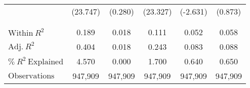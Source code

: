 \begin{xltabular}{\linewidth}{X * {5}{S[table-format=4.3]}}
 & (23.747) & (0.280) & (23.327) & (-2.631) & (0.873)\\
 &  &  &  &  \vphantom{1} & \\
\midrule
 &  &  &  &  & \\
$\textrm{Within} \: R^2$ & {0.189} & {0.018} & {0.111} & {0.052} & {0.058}\\
$\textrm{Adj.} \: R^2$ & {0.404} & {0.018} & {0.243} & {0.083} & {0.088}\\
$\% \: R^2 \: \textrm{Explained}$ & {4.570} & {0.000} & {1.700} & {0.640} & {0.650}\\
$\textrm{Observations}$ & {947,909} & {947,909} & {947,909} & {947,909} & {947,909}\\*
\end{xltabular}
\endgroup{}